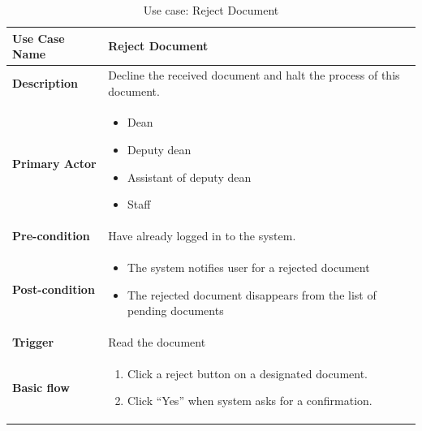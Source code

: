 \newcommand{\alreadylogin}{Have already logged in to the system}
\newcommand{\allICPersonel}{
	\begin{itemize}
		\item Dean
		\item Deputy dean
		\item Assistant of deputy dean
		\item Staff
	\end{itemize}
}

\begin{table}
	\centering
	\caption{Use case: Reject Document}
	\label{tbl-usecase:reject-document}
	
	\begin{tabular}{|l|L{9cm}|}
		\hline
		\textbf{Use Case Name} & Reject Document \\
		\hline
		
		\textbf{Description} & Decline the received document and halt the process of this document. \\
		\textbf{Primary Actor} & \allICPersonel \\
		\textbf{Pre-condition} & \alreadylogin. \\
		\textbf{Post-condition} & 
		\begin{itemize}
			\item The system notifies user for a rejected document
			\item The rejected document disappears from the list of pending documents
		\end{itemize} \\
		\textbf{Trigger} & Read the document \\
		\textbf{Basic flow} & 
		\begin{enumerate}
			\item Click a reject button on a designated document.
			\item Click \enquote{Yes} when system asks for a confirmation.
		\end{enumerate} \\
		\hline
	\end{tabular}
\end{table}

